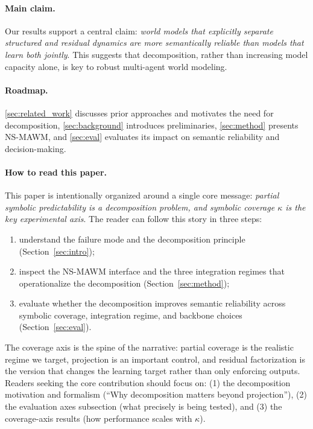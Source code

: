 \documentclass{article}
\theoremstyle{plain}
\theoremstyle{definition}
\theoremstyle{remark}
\begin{document}
\paragraph{Main claim.}
Our results support a central claim: \emph{world models that explicitly separate structured and residual dynamics are more semantically reliable than models that learn both jointly}. This suggests that decomposition, rather than increasing model capacity alone, is key to robust multi-agent world modeling.

\paragraph{Roadmap.}
\autoref{sec:related_work} discusses prior approaches and motivates the need for decomposition, \autoref{sec:background} introduces preliminaries, \autoref{sec:method} presents NS-MAWM, and \autoref{sec:eval} evaluates its impact on semantic reliability and decision-making.

\paragraph{How to read this paper.}
This paper is intentionally organized around a single core message:
\emph{partial symbolic predictability is a decomposition problem, and symbolic coverage $\kappa$ is the key experimental axis}.
The reader can follow this story in three steps:
\begin{enumerate}
  \item understand the failure mode and the decomposition principle (Section~\ref{sec:intro});
  \item inspect the NS-MAWM interface and the three integration regimes that operationalize the decomposition (Section~\ref{sec:method});
  \item evaluate whether the decomposition improves semantic reliability across symbolic coverage, integration regime, and backbone choices (Section~\ref{sec:eval}).
\end{enumerate}
The coverage axis is the spine of the narrative: partial coverage is the realistic regime we target, projection is an important control, and residual factorization is the version that changes the learning target rather than only enforcing outputs.
Readers seeking the core contribution should focus on: (1) the decomposition motivation and formalism (``Why decomposition matters beyond projection''), (2) the evaluation axes subsection (what precisely is being tested), and (3) the coverage-axis results (how performance scales with $\kappa$).
\end{document}
